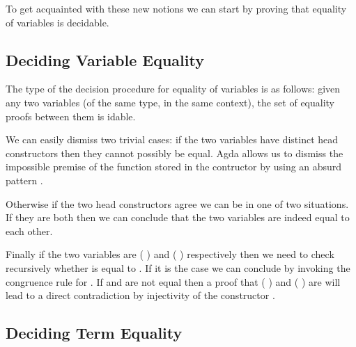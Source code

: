 To get acquainted with these new notions we can start by proving that equality
of variables is decidable.

\subsection{Deciding Variable Equality}

The type of the decision procedure for equality of variables is as follows:
given any two variables (of the same type, in the same context), the set of
equality proofs between them is idable.

\begin{agdasnippet}
\end{agdasnippet}

We can easily dismiss two trivial cases: if the two variables have distinct
head constructors then they cannot possibly be equal. Agda allows us to
dismiss the impossible premise of the function stored in the 
contructor by using an absurd pattern \AS{()}.

\begin{agdasnippet}
\end{agdasnippet}

Otherwise if the two head constructors agree we can be in one of two
situations. If they are both  then we can conclude that the two
variables are indeed equal to each other.

\begin{agdasnippet}
\end{agdasnippet}

Finally if the two variables are {( )} and {( )}
respectively then we need to check recursively whether  is equal
to . If it is the case we can conclude by invoking the congruence
rule for . If  and  are not equal then a proof that
{( )} and {( )} are will lead to a direct
contradiction by injectivity of the constructor .

\begin{agdasnippet}
\end{agdasnippet}

\subsection{Deciding Term Equality}

